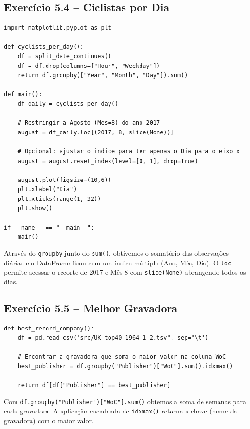 \documentclass[11pt,a4paper]{article}
\begin{document}
\subsection*{Exercício 5.4 -- Ciclistas por Dia}
\begin{solucao}
\begin{lstlisting}
import matplotlib.pyplot as plt

def cyclists_per_day():
    df = split_date_continues()
    df = df.drop(columns=["Hour", "Weekday"])
    return df.groupby(["Year", "Month", "Day"]).sum()

def main():
    df_daily = cyclists_per_day()
    
    # Restringir a Agosto (Mes=8) do ano 2017
    august = df_daily.loc[(2017, 8, slice(None))]
    
    # Opcional: ajustar o indice para ter apenas o Dia para o eixo x
    august = august.reset_index(level=[0, 1], drop=True)
    
    august.plot(figsize=(10,6))
    plt.xlabel("Dia")
    plt.xticks(range(1, 32))
    plt.show()

if __name__ == "__main__":
    main()
\end{lstlisting}
Através do \texttt{groupby} junto do \texttt{sum()}, obtivemos o somatório das observações diárias e o DataFrame ficou com um índice múltiplo (Ano, Mês, Dia). O \texttt{loc} permite acessar o recorte de 2017 e Mês 8 com \texttt{slice(None)} abrangendo todos os dias.
\end{solucao}

\subsection*{Exercício 5.5 -- Melhor Gravadora}
\begin{solucao}
\begin{lstlisting}
def best_record_company():
    df = pd.read_csv("src/UK-top40-1964-1-2.tsv", sep="\t")
    
    # Encontrar a gravadora que soma o maior valor na coluna WoC
    best_publisher = df.groupby("Publisher")["WoC"].sum().idxmax()
    
    return df[df["Publisher"] == best_publisher]
\end{lstlisting}
Com \texttt{df.groupby("Publisher")["WoC"].sum()} obtemos a soma de semanas para cada gravadora. A aplicação encadeada de \texttt{idxmax()} retorna a chave (nome da gravadora) com o maior valor.
\end{solucao}
\end{document}
